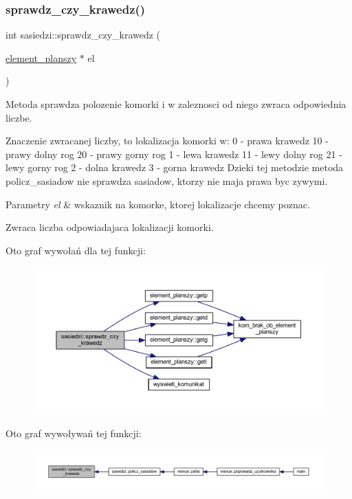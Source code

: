 \subsubsection{\texorpdfstring{sprawdz\+\_\+czy\+\_\+krawedz()}{sprawdz\_czy\_krawedz()}}
{\footnotesize\ttfamily int sasiedzi\+::sprawdz\+\_\+czy\+\_\+krawedz (\begin{DoxyParamCaption}\item[{\mbox{\hyperlink{classelement__planszy}{element\+\_\+planszy}} $\ast$}]{el }\end{DoxyParamCaption})}

Metoda sprawdza polozenie komorki i w zaleznosci od niego zwraca odpowiednia liczbe.

Znaczenie zwracanej liczby, to lokalizacja komorki w\+: 0 -\/ prawa krawedz 10 -\/ prawy dolny rog 20 -\/ prawy gorny rog 1 -\/ lewa krawedz 11 -\/ lewy dolny rog 21 -\/ lewy gorny rog 2 -\/ dolna krawedz 3 -\/ gorna krawedz Dzieki tej metodzie metoda policz\+\_\+sasiadow nie sprawdza sasiadow, ktorzy nie maja prawa byc zywymi. 
\begin{DoxyParams}{Parametry}
{\em el} & wskaznik na komorke, ktorej lokalizacje chcemy poznac. \\
\hline
\end{DoxyParams}
\begin{DoxyReturn}{Zwraca}
liczba odpowiadajaca lokalizacji komorki. 
\end{DoxyReturn}
Oto graf wywołań dla tej funkcji\+:
\nopagebreak
\begin{figure}[H]
\begin{center}
\leavevmode
\includegraphics[width=350pt]{classsasiedzi_a5d5fc98d8d077013af180ea83404c7a8_cgraph}
\end{center}
\end{figure}
Oto graf wywoływań tej funkcji\+:
\nopagebreak
\begin{figure}[H]
\begin{center}
\leavevmode
\includegraphics[width=350pt]{classsasiedzi_a5d5fc98d8d077013af180ea83404c7a8_icgraph}
\end{center}
\end{figure}
\mbox{\label{classsasiedzi_a10de1cc6691650a783a289b17f0769ce}} 
